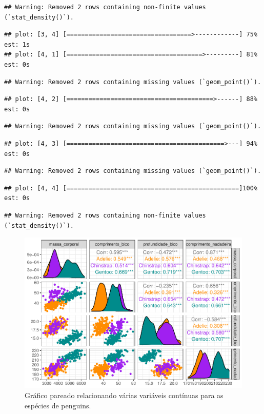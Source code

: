 \documentclass[
]{article}
\begin{document}
\begin{verbatim}
## Warning: Removed 2 rows containing non-finite values (`stat_density()`).
\end{verbatim}

\begin{verbatim}
## plot: [3, 4] [==================================>------------] 75% est: 1s
## plot: [4, 1] [=====================================>---------] 81% est: 0s
\end{verbatim}

\begin{verbatim}
## Warning: Removed 2 rows containing missing values (`geom_point()`).
\end{verbatim}

\begin{verbatim}
## plot: [4, 2] [========================================>------] 88% est: 0s
\end{verbatim}

\begin{verbatim}
## Warning: Removed 2 rows containing missing values (`geom_point()`).
\end{verbatim}

\begin{verbatim}
## plot: [4, 3] [===========================================>---] 94% est: 0s
\end{verbatim}

\begin{verbatim}
## Warning: Removed 2 rows containing missing values (`geom_point()`).
\end{verbatim}

\begin{verbatim}
## plot: [4, 4] [===============================================]100% est: 0s
\end{verbatim}

\begin{verbatim}
## Warning: Removed 2 rows containing non-finite values (`stat_density()`).
\end{verbatim}

\begin{figure}
\centering
\includegraphics{epr_files/figure-latex/fig-pairs-cont-1.pdf}
\caption{\label{fig:fig-pairs-cont}Gráfico pareado relacionando várias variáveis contínuas para as espécies de penguins.}
\end{figure}
\end{document}
